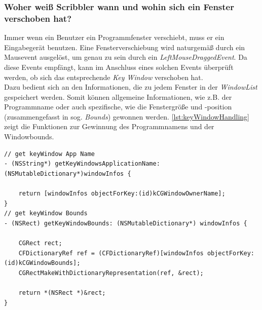 \subsubsection* {Woher weiß Scribbler wann und wohin sich ein Fenster verschoben hat?}
Immer wenn ein Benutzer ein Programmfenster verschiebt, muss er ein Eingabegerät benutzen. Eine Fensterverschiebung wird naturgemäß durch ein Mausevent ausgelöst, um genau zu sein durch ein \emph{LeftMouseDraggedEvent}. Da \scribbler diese Events empfängt, kann im Anschluss eines solchen Events überprüft werden, ob sich das entsprechende \emph{Key Window} verschoben hat. \\
Dazu bedient sich \scribbler an den Informationen, die zu jedem Fenster in der \emph{WindowList} gespeichert werden. Somit können allgemeine Informationen, wie z.B. der Programmname oder auch spezifische, wie die Fenstergröße und -position (zusammengefasst in sog. \emph{Bounds}) gewonnen werden. \autoref{lst:keyWindowHandling} zeigt die Funktionen zur Gewinnung des Programmnamens und der Windowbounds.

\begin{lstlisting}[float,caption=Key Window Handling,label=lst:keyWindowHandling]
// get keyWindow App Name
- (NSString*) getKeyWindowsApplicationName: (NSMutableDictionary*)windowInfos {
	
    return [windowInfos objectForKey:(id)kCGWindowOwnerName];
}
// get keyWindow Bounds
- (NSRect) getKeyWindowBounds: (NSMutableDictionary*) windowInfos {
	
    CGRect rect;
    CFDictionaryRef ref = (CFDictionaryRef)[windowInfos objectForKey:(id)kCGWindowBounds];
    CGRectMakeWithDictionaryRepresentation(ref, &rect);

    return *(NSRect *)&rect;
}
\end{lstlisting}

